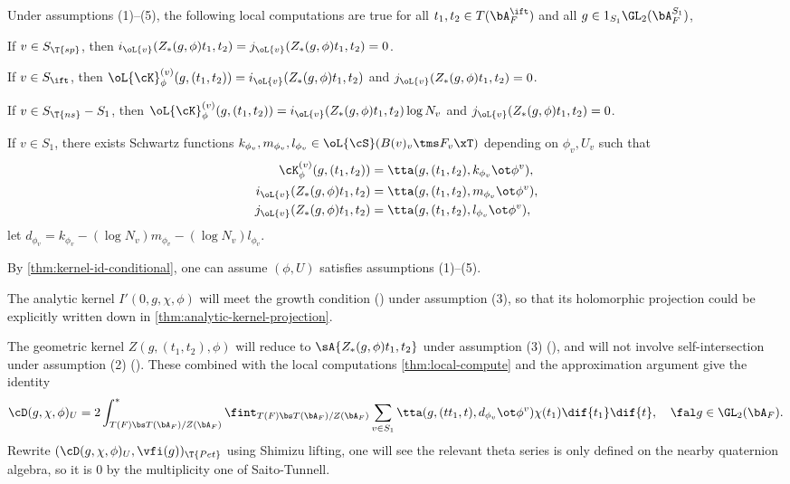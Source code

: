 \documentclass[article, a4paper, twoside]{universal}
\begin{document}
\begin{thm}\label{thm:local-compute}
    Under assumptions (1)--(5), the following local computations are true for all $t_{1},t_{2}\in T(\bA_{F}^{\ift})$ and all $g\in 1_{S_{1}}\GL_{2}(\bA_{F}^{S_{1}})$,
    \begin{itm}
        \item If $v\in S_{\T{sp}}$, then $i_{\oL{v}}(Z_{*}(g,\phi)t_{1},t_{2})=j_{\oL{v}}(Z_{*}(g,\phi)t_{1},t_{2})=0$.
        \item If $v\in S_{\ift}$, then $\oL{\cK}_{\phi}^{(v)}(g,(t_{1},t_{2}))=i_{\oL{v}}(Z_{*}(g,\phi)t_{1},t_{2})$ and $j_{\oL{v}}(Z_{*}(g,\phi)t_{1},t_{2})=0$.
        \item If $v\in S_{\T{ns}}-S_{1}$, then $\oL{\cK}_{\phi}^{(v)}(g,(t_{1},t_{2}))=i_{\oL{v}}(Z_{*}(g,\phi)t_{1},t_{2})\log N_{v}$ and $j_{\oL{v}}(Z_{*}(g,\phi)t_{1},t_{2})=0$.
        \item If $v\in S_{1}$, there exists Schwartz functions $k_{\phi_{v}},m_{\phi_{v}},l_{\phi_{v}}\in\oL{\cS}(B(v)_{v}\tms F_{v}\xT)$ depending on $\phi_{v},U_{v}$ such that
        \begin{align*}
          \cK_{\phi}^{(v)}(g,(t_{1},t_{2})) &=\tta(g,(t_{1},t_{2}),k_{\phi_{v}}\ot\phi^{v}), \\
          i_{\oL{v}}(Z_{*}(g,\phi)t_{1},t_{2}) &=\tta(g,(t_{1},t_{2}),m_{\phi_{v}}\ot\phi^{v}), \\
          j_{\oL{v}}(Z_{*}(g,\phi)t_{1},t_{2}) &=\tta(g,(t_{1},t_{2}),l_{\phi_{v}}\ot\phi^{v}),
        \end{align*}
        let $d_{\phi_{v}}=k_{\phi_{v}}-(\log N_{v})m_{\phi_{v}}-(\log N_{v})l_{\phi_{v}}$.
    \end{itm}
\end{thm}

\begin{prf}
    By \cref{thm:kernel-id-conditional}, one can assume $(\phi,U)$ satisfies assumptions (1)--(5).

    The analytic kernel $I'(0,g,\chi,\phi)$ will meet the growth condition (\cite[Proposition~6.14]{YZZ2013}) under assumption (3), so that its holomorphic projection could be explicitly written down in \cref{thm:analytic-kernel-projection}.

    The geometric kernel $Z(g,(t_{1},t_{2}),\phi)$ will reduce to $\sA{Z_{*}(g,\phi)t_{1},t_{2}}$ under assumption (3) (\cite[Proposition~7.5]{YZZ2013}), and will not involve self-intersection under assumption (2) (\cite[7.2.2]{YZZ2013}). These combined with the local computations \cref{thm:local-compute} and the approximation argument give the identity
    \[
        \cD(g,\chi,\phi)_{U}=2\int_{T(F)\bs T(\bA_{F})/Z(\bA_{F})}^{*}\fint_{T(F)\bs T(\bA_{F})/Z(\bA_{F})}\sum_{v\in S_{1}}\tta(g,(tt_{1},t), d_{\phi_{v}}\ot \phi^{v})\chi(t_{1})\dif{t_{1}}\dif{t},\quad \fal g\in\GL_{2}(\bA_{F}).
    \]
    Rewrite $(\cD(g,\chi,\phi)_{U},\vfi(g))_{\T{Pet}}$ using Shimizu lifting, one will see the relevant theta series is only defined on the nearby quaternion algebra, so it is $0$ by the multiplicity one of Saito-Tunnell.
\end{prf}
\end{document}
